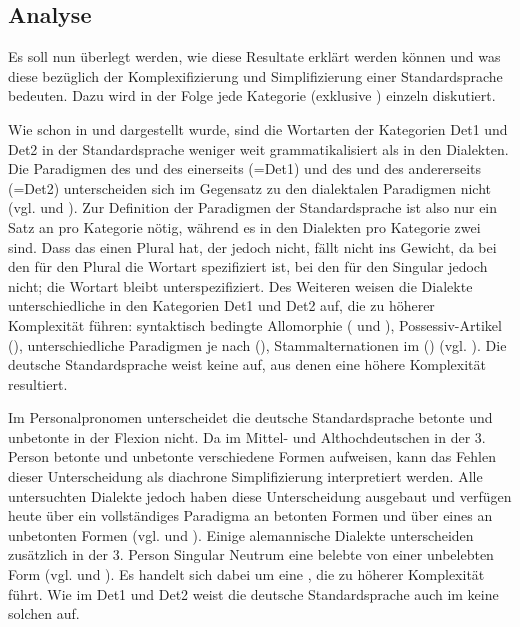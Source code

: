 \subsection{Analyse}\label{6.4.2}

Es soll nun überlegt werden, wie diese Resultate erklärt werden können und was diese bezüglich der Komplexifizierung und Simplifizierung einer Standardsprache bedeuten. Dazu wird in der Folge jede Kategorie (exklusive ) einzeln diskutiert.

Wie schon in  und  dargestellt wurde, sind die Wortarten der Kategorien {Det1 und Det2} in der Standardsprache weniger weit grammatikalisiert als in den Dialekten. Die Paradigmen des  und des  einerseits (=Det1) und des  und des  andererseits (=Det2) unterscheiden sich im Gegensatz zu den dialektalen Paradigmen nicht (vgl.  und ). Zur Definition der Paradigmen der Standardsprache ist also nur ein Satz an  pro Kategorie nötig, während es in den Dialekten pro Kategorie zwei sind. Dass das  einen Plural hat, der  jedoch nicht, fällt nicht ins Gewicht, da bei den  für den Plural die Wortart spezifiziert ist, bei den  für den Singular jedoch nicht; die Wortart bleibt unterspezifiziert. Des Weiteren weisen die Dialekte unterschiedliche  in den Kategorien Det1 und Det2 auf, die zu höherer Komplexität führen: syntaktisch bedingte Allomorphie ( und ), Possessiv-Artikel (), unterschiedliche Paradigmen je nach  (), Stammalternationen im  () (vgl. ). Die deutsche Standardsprache weist keine  auf, aus denen eine höhere Komplexität resultiert.

Im {Personalpronomen} unterscheidet die deutsche Standardsprache betonte und unbetonte  in der Flexion nicht. Da im Mittel- und Althochdeutschen in der 3. Person betonte und unbetonte  verschiedene Formen aufweisen, kann das Fehlen dieser Unterscheidung als diachrone Simplifizierung interpretiert werden. Alle untersuchten Dialekte jedoch haben diese Unterscheidung ausgebaut und verfügen heute über ein vollständiges Paradigma an betonten Formen und über eines an unbetonten Formen (vgl.  und ). Einige alemannische Dialekte unterscheiden zusätzlich in der 3. Person Singular Neutrum eine belebte von einer unbelebten Form (vgl.  und ). Es handelt sich dabei um eine , die zu höherer Komplexität führt. Wie im Det1 und Det2 weist die deutsche Standardsprache auch im  keine solchen  auf.

